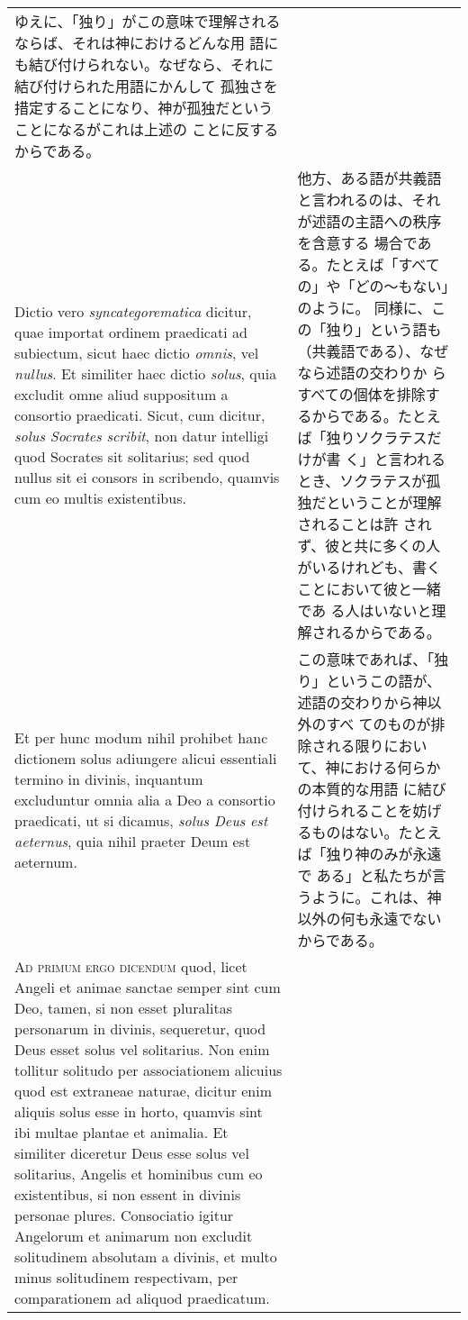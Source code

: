 \documentclass[10pt]{jsarticle} %
\begin{document}
\begin{longtable}{p{21em}p{21em}}
ゆえに、「独り」がこの意味で理解されるならば、それは神におけるどんな用
 語にも結び付けられない。なぜなら、それに結び付けられた用語にかんして
 孤独さを措定することになり、神が孤独だということになるがこれは上述の
 ことに反するからである。

\\

Dictio vero {\itshape syncategorematica} dicitur, quae importat
 ordinem praedicati ad subiectum, sicut haec dictio {\itshape omnis}, vel
 {\itshape nullus}. 
Et similiter haec dictio {\itshape solus}, quia excludit omne aliud
 suppositum a consortio praedicati. Sicut, cum dicitur, {\itshape solus Socrates
 scribit}, non datur intelligi quod Socrates sit solitarius; sed quod
 nullus sit ei consors in scribendo, quamvis cum eo multis
 existentibus. 


&

他方、ある語が共義語と言われるのは、それが述語の主語への秩序を含意する
 場合である。たとえば「すべての」や「どの〜もない」のように。
同様に、この「独り」という語も（共義語である）、なぜなら述語の交わりか
 らすべての個体を排除するからである。たとえば「独りソクラテスだけが書
 く」と言われるとき、ソクラテスが孤独だということが理解されることは許
 されず、彼と共に多くの人がいるけれども、書くことにおいて彼と一緒であ
 る人はいないと理解されるからである。

\\


Et per hunc modum nihil prohibet hanc dictionem solus
 adiungere alicui essentiali termino in divinis, inquantum excluduntur
 omnia alia a Deo a consortio praedicati, ut si dicamus, {\itshape solus Deus
 est aeternus}, quia nihil praeter Deum est aeternum.

&

この意味であれば、「独り」というこの語が、述語の交わりから神以外のすべ
 てのものが排除される限りにおいて、神における何らかの本質的な用語
 に結び付けられることを妨げるものはない。たとえば「独り神のみが永遠で
 ある」と私たちが言うように。これは、神以外の何も永遠でないからである。


\\




{\scshape Ad primum ergo dicendum} quod, licet Angeli et animae sanctae semper
 sint cum Deo, tamen, si non esset pluralitas personarum in divinis,
 sequeretur, quod Deus esset solus vel solitarius. Non enim tollitur
 solitudo per associationem alicuius quod est extraneae naturae,
 dicitur enim aliquis solus esse in horto, quamvis sint ibi multae
 plantae et animalia. Et similiter diceretur Deus esse solus vel
 solitarius, Angelis et hominibus cum eo existentibus, si non essent
 in divinis personae plures. Consociatio igitur Angelorum et animarum
 non excludit solitudinem absolutam a divinis, et multo minus
 solitudinem respectivam, per comparationem ad aliquod praedicatum.


\end{longtable}
\end{document}
